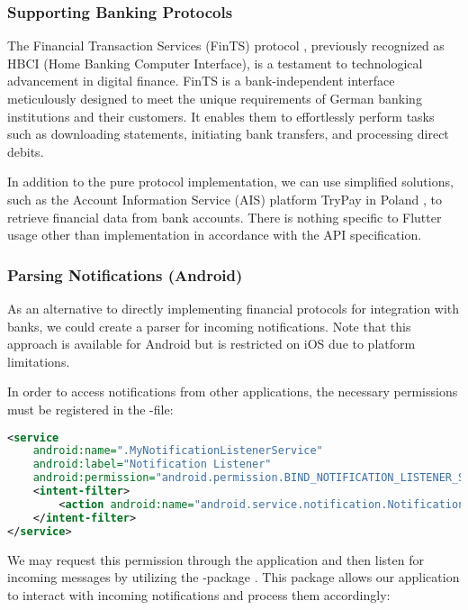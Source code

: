 \subsubsection{Supporting Banking Protocols}

The Financial Transaction Services (FinTS) protocol , previously recognized as HBCI (Home Banking Computer 
Interface), is a testament to technological advancement in digital finance. FinTS is a bank-independent interface 
meticulously designed to meet the unique requirements of German banking institutions and their customers. It enables 
them to effortlessly perform tasks such as downloading statements, initiating bank transfers, and processing direct 
debits. 

In addition to the pure protocol implementation, we can use simplified solutions, such as the Account Information 
Service (AIS) platform TryPay in Poland , to retrieve financial data from bank accounts. There is nothing 
specific to Flutter usage other than implementation in accordance with the API specification.


\subsubsection{Parsing Notifications (Android)}

As an alternative to directly implementing financial protocols for integration with banks, we could create a parser for 
incoming notifications. Note that this approach is available for Android but is restricted on iOS due to platform 
limitations.

In order to access notifications from other applications, the necessary permissions must be registered in the 
-file:

\begin{lstlisting}[language=xml]
<service
    android:name=".MyNotificationListenerService"
    android:label="Notification Listener"
    android:permission="android.permission.BIND_NOTIFICATION_LISTENER_SERVICE">
    <intent-filter>
        <action android:name="android.service.notification.NotificationListenerService" />
    </intent-filter>
</service>
\end{lstlisting}

\noindent We may request this permission through the application and then listen for incoming messages by utilizing the 
-package . This package allows our application to interact with incoming 
notifications and process them accordingly:

